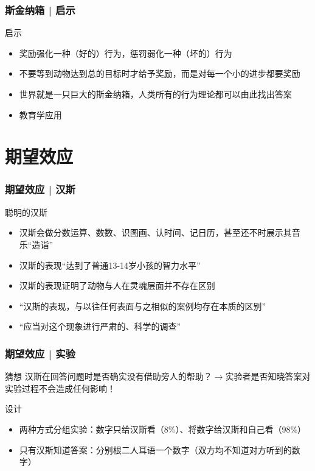 \begin{frame}
  \frametitle{斯金纳箱 | 启示}
  \begin{block}{启示}
    \begin{itemize}
      \item 奖励强化一种（好的）行为，惩罚弱化一种（坏的）行为
      \item 不要等到动物达到总的目标时才给予奖励，而是对每一个小的进步都要奖励
      \item 世界就是一只巨大的斯金纳箱，人类所有的行为理论都可以由此找出答案
      \item 教育学应用
    \end{itemize}
  \end{block}
\end{frame}

\section{期望效应}
\begin{frame}
  \frametitle{期望效应 | 汉斯}
  \begin{block}{聪明的汉斯}
    \begin{itemize}
      \item 汉斯会做分数运算、数数、识图画、认时间、记日历，甚至还不时展示其音乐“造诣”
      \item 汉斯的表现“达到了普通13-14岁小孩的智力水平”
      \item 汉斯的表现证明了动物与人在灵魂层面并不存在区别
      \item “汉斯的表现，与以往任何表面与之相似的案例均存在本质的区别”
      \item “应当对这个现象进行严肃的、科学的调查”
    \end{itemize}
  \end{block}
\end{frame}

\begin{frame}
  \frametitle{期望效应 | 实验}
  \begin{block}{猜想}
    汉斯在回答问题时是否确实没有借助旁人的帮助？$\longrightarrow$实验者是否知晓答案对实验过程不会造成任何影响！
  \end{block}
  \pause
  \begin{block}{设计}
    \begin{itemize}
      \item 两种方式分组实验：数字只给汉斯看（8\%）、将数字给汉斯和自己看（98\%）
      \item 只有汉斯知道答案：分别根二人耳语一个数字（双方均不知道对方听到的数字）
    \end{itemize}
  \end{block}
\end{frame}

